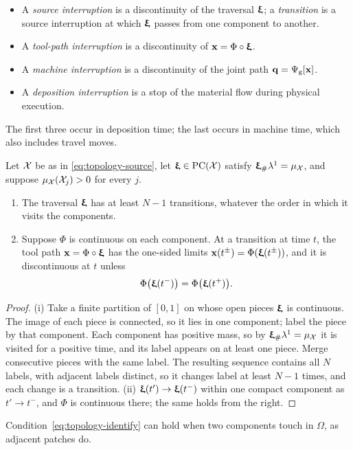 \begin{definition}[Interruptions]
  \label{def:topology-interruptions}
  \leavevmode
  \begin{itemize}
    \item A \emph{source interruption} is a discontinuity of the traversal ${\bm{\mathrm{\upxi}}}$; a \emph{transition} is a source interruption at which ${\bm{\mathrm{\upxi}}}$ passes from one component to another.
    \item A \emph{tool-path interruption} is a discontinuity of ${\bm{\mathrm{x}}}=\Phi\circ{\bm{\mathrm{\upxi}}}$.
    \item A \emph{machine interruption} is a discontinuity of the joint path ${\bm{\mathrm{q}}}=\Psi_{\mathrm{g}}[{\bm{\mathrm{x}}}]$.
    \item A \emph{deposition interruption} is a stop of the material flow during physical execution.
  \end{itemize}
\end{definition}
The first three occur in deposition time; the last occurs in machine time, which also includes travel moves.

\begin{proposition}
  \label{prop:topology-transitions}
  Let $\mathcal{X}$ be as in \eqref{eq:topology-source}, let ${\bm{\mathrm{\upxi}}}\in\operatorname{PC}(\mathcal{X})$ satisfy ${\bm{\mathrm{\upxi}}}_\#\lambda^1=\mu_{\mathcal{X}}$, and suppose $\mu_{\mathcal{X}}(\mathcal{X}_j)>0$ for every $j$.
  \begin{enumerate}[label=(\roman*)]
    \item The traversal ${\bm{\mathrm{\upxi}}}$ has at least $N-1$ transitions, whatever the order in which it visits the components.
    \item Suppose $\Phi$ is continuous on each component. At a transition at time $t$, the tool path ${\bm{\mathrm{x}}}=\Phi\circ{\bm{\mathrm{\upxi}}}$ has the one-sided limits ${\bm{\mathrm{x}}}(t^\pm)=\Phi({\bm{\mathrm{\upxi}}}(t^\pm))$, and it is discontinuous at $t$ unless
          \begin{equation}
            \label{eq:topology-identify}
            \Phi\bigl({\bm{\mathrm{\upxi}}}(t^-)\bigr)=\Phi\bigl({\bm{\mathrm{\upxi}}}(t^+)\bigr).
          \end{equation}
  \end{enumerate}
\end{proposition}
\begin{proof}
  (i) Take a finite partition of $[0,1]$ on whose open pieces ${\bm{\mathrm{\upxi}}}$ is continuous. The image of each piece is connected, so it lies in one component; label the piece by that component. Each component has positive mass, so by ${\bm{\mathrm{\upxi}}}_\#\lambda^1=\mu_{\mathcal{X}}$ it is visited for a positive time, and its label appears on at least one piece. Merge consecutive pieces with the same label. The resulting sequence contains all $N$ labels, with adjacent labels distinct, so it changes label at least $N-1$ times, and each change is a transition. (ii) ${\bm{\mathrm{\upxi}}}(t')\to{\bm{\mathrm{\upxi}}}(t^-)$ within one compact component as $t'\to t^-$, and $\Phi$ is continuous there; the same holds from the right.
\end{proof}
Condition~\eqref{eq:topology-identify} can hold when two components touch in $\Omega$, as adjacent patches do.


